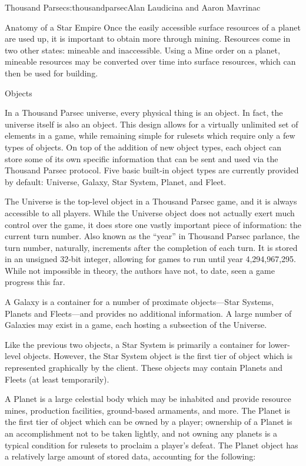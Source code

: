 \begin{aosachapter}{Thousand Parsec}{s:thousandparsec}{Alan Laudicina and Aaron Mavrinac}
\begin{aosasect1}{Anatomy of a Star Empire}
Once the easily accessible surface resources of a planet are used up,
it is important to obtain more through mining. Resources come in two
other states: mineable and inaccessible. Using a Mine order on a
planet, mineable resources may be converted over time into surface
resources, which can then be used for building.

\begin{aosasect2}{Objects}

In a Thousand Parsec universe, every physical thing is an object. In
fact, the universe itself is also an object. This design allows for a
virtually unlimited set of elements in a game, while remaining simple
for rulesets which require only a few types of objects. On top of the
addition of new object types, each object can store some of its own
specific information that can be sent and used via the Thousand Parsec
protocol. Five basic built-in object types are currently provided by
default: Universe, Galaxy, Star System, Planet, and Fleet.

The Universe is the top-level object in a Thousand Parsec game, and it
is always accessible to all players. While the Universe object does
not actually exert much control over the game, it does store one
vastly important piece of information: the current turn number. Also
known as the ``year'' in Thousand Parsec parlance, the turn number,
naturally, increments after the completion of each turn. It is stored
in an unsigned 32-bit integer, allowing for games to run until year
4,294,967,295. While not impossible in theory, the authors have not,
to date, seen a game progress this far.

A Galaxy is a container for a number of proximate objects---Star
Systems, Planets and Fleets---and provides no additional
information. A large number of Galaxies may exist in a game, each
hosting a subsection of the Universe.

Like the previous two objects, a Star System is primarily a container
for lower-level objects. However, the Star System object is the first
tier of object which is represented graphically by the client. These
objects may contain Planets and Fleets (at least temporarily).

A Planet is a large celestial body which may be inhabited and provide
resource mines, production facilities, ground-based armaments, and
more. The Planet is the first tier of object which can be owned by a
player; ownership of a Planet is an accomplishment not to be taken
lightly, and not owning any planets is a typical condition for
rulesets to proclaim a player's defeat. The Planet object has a
relatively large amount of stored data, accounting for the following:


\end{aosasect2}
\end{aosasect1}
\end{aosachapter}
